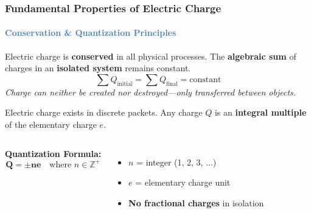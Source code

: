 \begin{frame}
\frametitle{\textsf{\textbf{Fundamental Properties of Electric Charge}}}
\framesubtitle{\textcolor{steelblue}{Conservation \& Quantization Principles}}

\vspace{-0.1cm}

\begin{keybox}
\vspace{0.1cm}
Electric charge is \textbf{conserved} in all physical processes. The \textbf{algebraic sum} of charges in an \textbf{isolated system} remains constant.
\begin{equation*}
\boxed{\sum Q_{\text{initial}} = \sum Q_{\text{final}} = \text{constant}}
\end{equation*}
\vspace{0.05cm}
\textit{Charge can neither be created nor destroyed—only transferred between objects.}
\end{keybox}

\vspace{0.35cm}

\begin{examplebox}
\vspace{0.1cm}
Electric charge exists in discrete packets. Any charge $Q$ is an \textbf{integral multiple} of the elementary charge $e$.

\vspace{0.2cm}

\begin{columns}[T]
    \textbf{Quantization Formula:}
    \begin{equation*}
    \boxed{\mathbf{Q = \pm ne}} \quad \text{where } n \in \mathbb{Z}^+
    \end{equation*}
    \vspace{0.1cm}
    \begin{itemize}
        \item $n$ = integer (1, 2, 3, ...)
        \item $e$ = elementary charge unit
        \item \textbf{No fractional charges} in isolation
    \end{itemize}
    

\end{columns}
\end{examplebox}
\end{frame}
